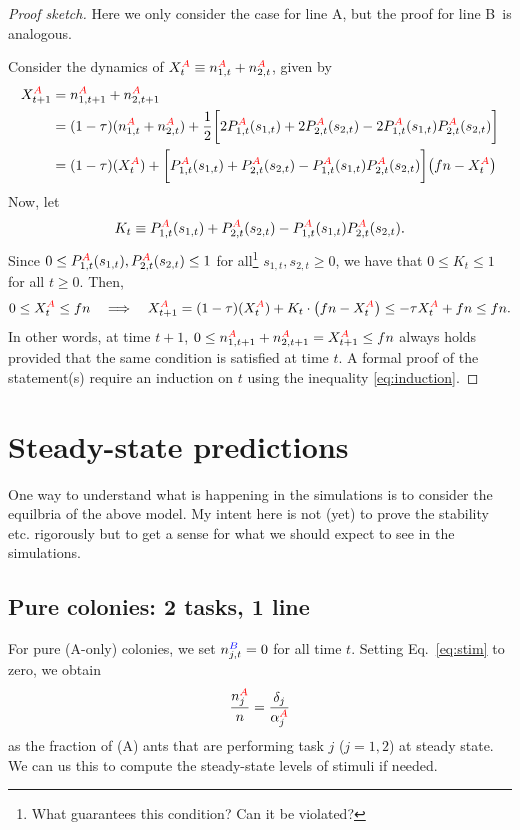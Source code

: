 \documentclass[10pt]{article}
\newcommand{\A}{{\color{red}A}}
\newcommand{\B}{{\color{blue}B}}
\begin{document}
\begin{proof}[Proof sketch]
Here we only consider the case for line \A, but the proof for line \B\ is analogous.

Consider the dynamics of $X_{t}^{\A} \equiv n_{1,t}^{\A}+n_{2,t}^{\A}$, given by
\begin{align*}
    X_{t+1}^{\A} & = n_{1,t+1}^{\A}+n_{2,t+1}^{\A} \\
    &= (1-\tau)(n_{1,t}^{\A}+n_{2,t}^{\A}) + \frac{1}{2}
    \bigg[ 2P_{1,t}^{\A}(s_{1,t}) + 2P_{2,t}^{\A}(s_{2,t}) - 2 P_{1,t}^{\A}(s_{1,t}) P_{2,t}^{\A}(s_{2,t})\bigg] \\
    &= (1-\tau)(X_{t}^{\A}) + 
    \bigg[ P_{1,t}^{\A}(s_{1,t}) + P_{2,t}^{\A}(s_{2,t}) -  P_{1,t}^{\A}(s_{1,t}) P_{2,t}^{\A}(s_{2,t})\bigg]
    \big( fn - X_{t}^{\A} \big)
\end{align*}
Now, let
\begin{align*}
    K_{t} \equiv P_{1,t}^{\A}(s_{1,t}) + P_{2,t}^{\A}(s_{2,t}) -  P_{1,t}^{\A}(s_{1,t}) P_{2,t}^{\A}(s_{2,t}).
\end{align*}
Since $0 \leq P_{1,t}^{\A}(s_{1,t}), P_{2,t}^{\A}(s_{2,t}) \leq 1$ for all\footnote{What guarantees this condition? Can it be violated?} $ s_{1,t}, s_{2,t} \geq 0$, we have that $0\leq K_t \leq 1$ for all $t\geq 0$. Then,
\begin{align}
    0\leq X_{t}^{\A} \leq fn \quad\Longrightarrow\quad X_{t+1}^{\A} = (1-\tau)(X_{t}^{\A}) + 
    K_{t}\cdot\big( fn - X_{t}^{\A} \big) \leq -\tau X_{t}^{\A} + fn \leq fn. \label{eq:induction}
\end{align}
In other words, at time $t+1$, $0\leq n_{1,t+1}^{\A}+n_{2,t+1}^{\A} = X_{t+1}^{\A} \leq fn$ always holds provided that the same condition is satisfied at time $t$.
A formal proof of the statement(s) require an induction on $t$ using the inequality \eqref{eq:induction}.
\end{proof}

\section{Steady-state predictions} \label{sec:ss}
One way to understand what is happening in the simulations is to consider the equilbria of the above model. My intent here is not (yet) to prove the stability etc. rigorously but to get a sense for what we should expect to see in the simulations.

\subsection{Pure colonies: 2 tasks, 1 line}
For pure (\A-only) colonies, we set $n_{j,t}^{\B} = 0$ for all time $t$. Setting Eq.~\eqref{eq:stim} to zero, we obtain
\begin{equation}
    \frac{n_j^{\A}}{n} = \frac{\delta_j}{\alpha_j^{\A}}
    \label{eq:ss1}
\end{equation}
as the fraction of (\A) ants that are performing task $j$ ($j = 1,2$) at steady state. We can us this to compute the steady-state levels of stimuli if needed.
\end{document}
